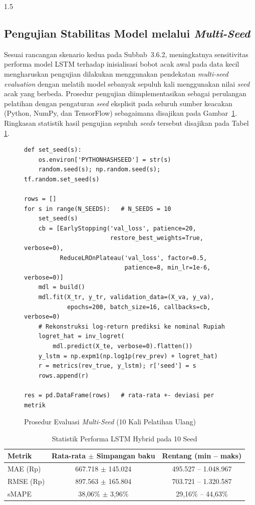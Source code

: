 \documentclass[12pt, a4paper, onecolumn, oneside]{report}
\begin{document}
\begin{spacing}{1.5}
\subsection{Pengujian Stabilitas Model melalui \textit{Multi-Seed}}

Sesuai rancangan skenario kedua pada Subbab~3.6.2, meningkatnya sensitivitas performa model LSTM terhadap inisialisasi bobot acak awal pada data kecil mengharuskan pengujian dilakukan menggunakan pendekatan \textit{multi-seed evaluation} dengan melatih model sebanyak sepuluh kali menggunakan nilai \textit{seed} acak yang berbeda. Prosedur pengujian diimplementasikan sebagai perulangan pelatihan dengan pengaturan \textit{seed} eksplisit pada seluruh sumber keacakan (Python, NumPy, dan TensorFlow) sebagaimana disajikan pada Gambar~\ref{fig:multiseed}. Ringkasan statistik hasil pengujian sepuluh \textit{seeds} tersebut disajikan pada Tabel \ref{tab:statistik_multiseed}.

\begin{figure}[H]
\begin{lstlisting}
def set_seed(s):
    os.environ['PYTHONHASHSEED'] = str(s)
    random.seed(s); np.random.seed(s); tf.random.set_seed(s)

rows = []
for s in range(N_SEEDS):   # N_SEEDS = 10
    set_seed(s)
    cb = [EarlyStopping('val_loss', patience=20,
                        restore_best_weights=True, verbose=0),
          ReduceLROnPlateau('val_loss', factor=0.5,
                            patience=8, min_lr=1e-6, verbose=0)]
    mdl = build()
    mdl.fit(X_tr, y_tr, validation_data=(X_va, y_va),
            epochs=200, batch_size=16, callbacks=cb, verbose=0)
    # Rekonstruksi log-return prediksi ke nominal Rupiah
    logret_hat = inv_logret(
        mdl.predict(X_te, verbose=0).flatten())
    y_lstm = np.expm1(np.log1p(rev_prev) + logret_hat)
    r = metrics(rev_true, y_lstm); r['seed'] = s
    rows.append(r)

res = pd.DataFrame(rows)   # rata-rata +- deviasi per metrik
\end{lstlisting}
\caption{Prosedur Evaluasi \textit{Multi-Seed} (10 Kali Pelatihan Ulang)}
\label{fig:multiseed}
\end{figure}

\begin{table}[H]
\centering
\caption{Statistik Performa LSTM Hybrid pada 10 Seed}
\label{tab:statistik_multiseed}
\begin{tabular}{|l|c|c|}
\hline
\textbf{Metrik} & \textbf{Rata-rata $\pm$ Simpangan baku} & \textbf{Rentang (min -- maks)} \\ \hline
MAE (Rp) & 667.718 $\pm$ 145.024 & 495.527 -- 1.048.967 \\ \hline
RMSE (Rp) & 897.563 $\pm$ 165.804 & 703.721 -- 1.320.587 \\ \hline
sMAPE & 38,06\% $\pm$ 3,96\% & 29,16\% -- 44,63\% \\ \hline
\end{tabular}
\end{table}


\end{spacing}
\end{document}
